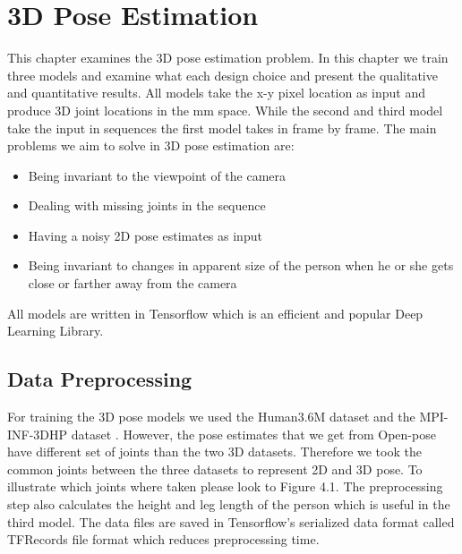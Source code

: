 
\chapter{3D Pose Estimation}\label{chapter:3Dpose}

This chapter examines the 3D pose estimation problem. In this chapter we train three models and examine what each design choice and present the qualitative and quantitative results. All models take the x-y pixel location as input and produce 3D joint locations in the mm space. While the second and third model take the input in sequences the first model takes in frame by frame. The main problems we aim to solve in 3D pose estimation are:
\begin{itemize}
    \item Being invariant to the viewpoint of the camera
    \item Dealing with missing joints in the sequence
    \item Having a noisy 2D pose estimates as input
    \item Being invariant to changes in apparent size of the person when he or she gets close or farther away from the camera
\end{itemize}

All models are written in Tensorflow \parencite{abadi2016tensorflow} which is an efficient and popular Deep Learning Library.

\section{Data Preprocessing}

For training the 3D pose models we used the Human3.6M dataset \parencite{ionescu2014human3} and the MPI-INF-3DHP dataset \parencite{mehta2017monocular}. However, the pose estimates that we get from Open-pose \parencite{cao2016realtime} have different set of joints than the two 3D datasets. Therefore we took the common joints between the three datasets to represent 2D and 3D pose. To illustrate which joints where taken please look to Figure 4.1. The preprocessing step also calculates the height and leg length of the person which is useful in the third model. The data files are saved in Tensorflow's \parencite{abadi2016tensorflow} serialized data format called TFRecords file format which reduces preprocessing time.

